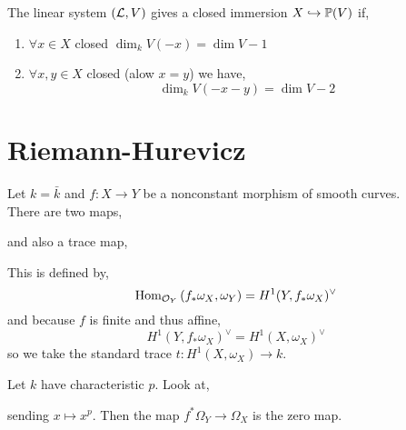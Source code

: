\documentclass[12pt]{article}
\begin{document}
\begin{prop}
The linear system $(\mathcal{L}, V)$ gives a closed immersion $X \hookrightarrow \mathbb{P}(V)$ if,
\begin{enumerate}
\item $\forall x \in X$ closed $\dim_k V(-x) = \dim{V} - 1$
\item $\forall x, y \in X$ closed (alow $x = y$) we have,
\[ \dim_k V(-x -y) = \dim{V} - 2 \]
\end{enumerate}
\end{prop}

\section{Riemann-Hurevicz}

Let $k = \bar{k}$ and $f : X \to Y$ be a nonconstant morphism of smooth curves.
\bigskip\\
There are two maps,
\begin{center}
\end{center}
and also a trace map,
\begin{center}
\end{center}
This is defined by,
\[ \mathrm{Hom}_{\mathcal{O}_{Y}} \left( f_* \omega_X, \omega_Y \right) = H^1(Y, f_* \omega_X)^\vee \]
and because $f$ is finite and thus affine,
\[ H^1(Y, f_* \omega_X)^\vee = H^1(X, \omega_X)^\vee \]
so we take the standard trace $t : H^1(X, \omega_X) \to k$. 

\begin{example}
Let $k$ have characteristic $p$. Look at,
\begin{center}
\end{center}
sending $x \mapsto x^p$. Then the map $f^* \Omega_{Y} \to \Omega_X$ is the zero map. 
\end{example}
\end{document}
